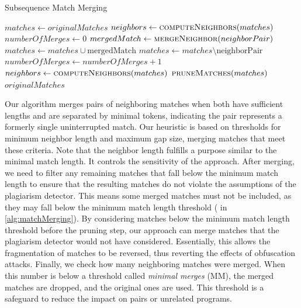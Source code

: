 \begin{algorithm}
\caption{Subsequence Match Merging}\label{alg:matchMerging}
\begin{algorithmic}[1]
  \State $matches \gets originalMatches$
  \State $neighbors \gets \textproc{computeNeighbors}(matches)$
  \State $numberOfMerges \gets 0$
  \Repeat
        \State $mergedMatch \gets \textproc{mergeNeighbor}(neighborPair)$
        \State $matches \gets matches \cup \text{mergedMatch}$
        \State $matches \gets matches \setminus \text{neighborPair}$
        \State $numberOfMerges \gets numberOfMerges +1$
      \EndIf
    \EndFor
    \State $neighbors \gets \textproc{computeNeighbors}(matches)$
    \State \Return $\textproc{pruneMatches}(matches)$
  \Else
    \State \Return $originalMatches$
  \EndIf
\end{algorithmic}
\end{algorithm}

Our algorithm merges pairs of neighboring matches when both have sufficient lengths and are separated by minimal tokens, indicating the pair represents a formerly single uninterrupted match. Our heuristic is based on thresholds for minimum neighbor length and maximum gap size, merging matches that meet these criteria.
Note that the neighbor length fulfills a purpose similar to the minimal match length. It controls the sensitivity of the approach.
%
After merging, we need to filter any remaining matches that fall below the minimum match length to ensure that the resulting matches do not violate the assumptions of the plagiarism detector. This means some merged matches must not be included, as they may fall below the minimum match length threshold ( in \autoref{alg:matchMerging}).
By considering matches below the minimum match length threshold before the pruning step, our approach can merge matches that the plagiarism detector would not have considered. Essentially, this allows the fragmentation of matches to be reversed, thus reverting the effects of obfuscation attacks.
Finally, we check how many neighboring matches were merged. When this number is below a threshold called \textit{minimal merges} (MM), the merged matches are dropped, and the original ones are used. This threshold is a safeguard to reduce the impact on pairs or unrelated programs.

